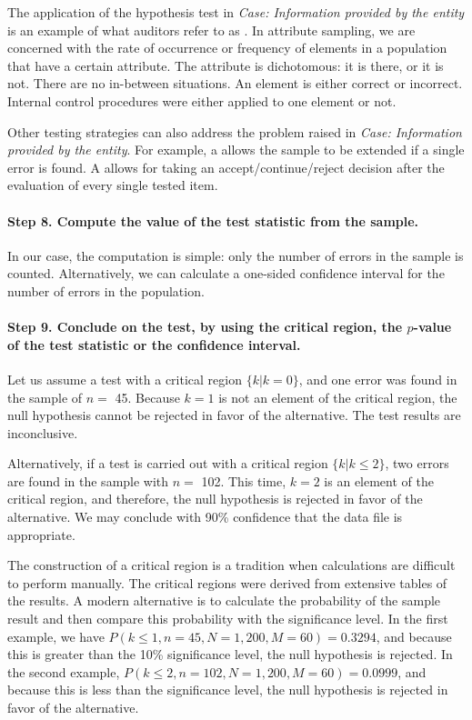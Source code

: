 \bigskip
The application of the hypothesis test in \emph{Case: Information provided by the entity} is an example of what auditors refer to as . In attribute sampling, we are concerned with the rate of occurrence or frequency of elements in a population that have a certain attribute. The attribute is dichotomous: it is there, or it is not. There are no in-between situations. An element is either correct or incorrect. Internal control procedures were either applied to one element or not.

Other testing strategies can also address the problem raised in \emph{Case: Information provided by the entity}. For example, a  allows the sample to be extended if a single error is found. A  allows for taking an accept/continue/reject decision after the evaluation of every single tested item.

\paragraph{Step 8. Compute the value of the test statistic from the sample.} In our case, the computation is simple: only the number of errors in the sample is counted. Alternatively, we can calculate a one-sided confidence interval for the number of errors in the population.

\paragraph{Step 9. Conclude on the test, by using the critical region, the $p$-value of the test statistic or the confidence interval.} Let us assume a test with a critical region $\{k | k = 0\}$, and one error was found in the sample of $n =$ 45. Because $k = 1$ is not an element of the critical region, the null hypothesis cannot be rejected in favor of the alternative. The test results are inconclusive.

Alternatively, if a test is carried out with a critical region $\{k | k \leq 2\}$, two errors are found in the sample with $n =$ 102. This time, $k = 2$ is an element of the critical region, and therefore, the null hypothesis is rejected in favor of the alternative. We may conclude with 90\% confidence that the data file is appropriate.

\bigskip
The construction of a critical region is a tradition when calculations are difficult to perform manually. The critical regions were derived from extensive tables of the results. A modern alternative is to calculate the probability of the sample result and then compare this probability with the significance level. In the first example, we have $P(k \leq 1, n = 45, N = 1,200, M = 60) = 0.3294$\label{p_value1}, and because this is greater than the 10\% significance level, the null hypothesis is rejected. In the second example, $P(k \leq 2, n = 102, N = 1,200, M = 60) = 0.0999$, and because this is less than the significance level, the null hypothesis is rejected in favor of the alternative.

